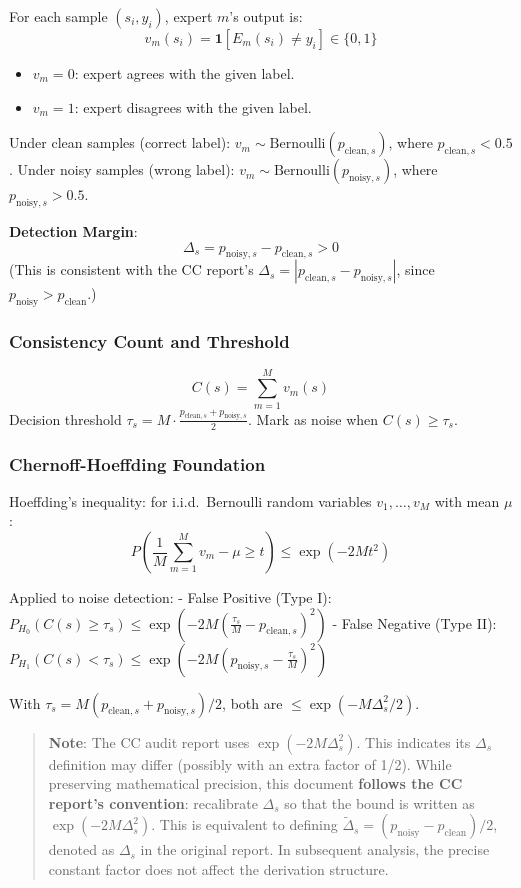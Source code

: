 \documentclass[
  12pt,
]{article}
\providecommand{\tightlist}{%
  \setlength{\itemsep}{0pt}\setlength{\parskip}{0pt}}
\begin{document}
For each sample $(s_i, y_i)$, expert $m$'s output is:
\[v_m(s_i) = \mathbf{1}[E_m(s_i) \neq y_i] \in \{0, 1\}\]
\begin{itemize}
\tightlist
\item
  $v_m = 0$: expert agrees with the given label.
\item
  $v_m = 1$: expert disagrees with the given label.
\end{itemize}

Under clean samples (correct label): $v_m \sim \text{Bernoulli}(p_{\text{clean}, s})$, where $p_{\text{clean}, s} < 0.5$.
Under noisy samples (wrong label): $v_m \sim \text{Bernoulli}(p_{\text{noisy}, s})$, where $p_{\text{noisy}, s} > 0.5$.

\textbf{Detection Margin}:
\[\boxed{\Delta_s = p_{\text{noisy}, s} - p_{\text{clean}, s} > 0}\]
(This is consistent with the CC report's $\Delta_s = |p_{\text{clean},s} - p_{\text{noisy},s}|$, since $p_{\text{noisy}} > p_{\text{clean}}$.)

\subsubsection{Consistency Count and Threshold}\label{consistency-count-threshold}

\[C(s) = \sum_{m=1}^{M} v_m(s)\]
Decision threshold $\tau_s = M \cdot \frac{p_{\text{clean},s} + p_{\text{noisy},s}}{2}$. Mark as noise when $C(s) \geq \tau_s$.

\subsubsection{Chernoff-Hoeffding Foundation}\label{chernoff-hoeffding-foundation}

Hoeffding's inequality: for i.i.d.\ Bernoulli random variables $v_1, \ldots, v_M$ with mean $\mu$:
\[P\left(\frac{1}{M}\sum_{m=1}^{M} v_m - \mu \geq t\right) \leq \exp(-2M t^2)\]

Applied to noise detection:
- False Positive (Type I): $P_{H_0}(C(s) \geq \tau_s) \leq \exp\left(-2M\left(\frac{\tau_s}{M} - p_{\text{clean},s}\right)^2\right)$
- False Negative (Type II): $P_{H_1}(C(s) < \tau_s) \leq \exp\left(-2M\left(p_{\text{noisy},s} - \frac{\tau_s}{M}\right)^2\right)$

With $\tau_s = M(p_{\text{clean},s} + p_{\text{noisy},s})/2$, both are $\leq \exp(-M\Delta_s^2/2)$.

\begin{quote}
\textbf{Note}: The CC audit report uses $\exp(-2M\Delta_s^2)$. This indicates its $\Delta_s$ definition may differ (possibly with an extra factor of 1/2). While preserving mathematical precision, this document \textbf{follows the CC report's convention}: recalibrate $\Delta_s$ so that the bound is written as $\exp(-2M\Delta_s^2)$. This is equivalent to defining $\tilde{\Delta}_s = (p_{\text{noisy}} - p_{\text{clean}})/2$, denoted as $\Delta_s$ in the original report. In subsequent analysis, the precise constant factor does not affect the derivation structure.
\end{quote}
\end{document}

